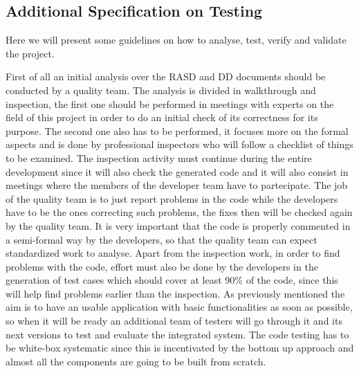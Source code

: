 \subsection{Additional Specification on Testing}
Here we will present some guidelines on how to analyse, test, verify and validate the project.

First of all an initial analysis over the RASD and DD documents should be conducted by a quality team.
The analysis is divided in walkthrough and inspection, the first one should be performed in meetings with experts on the field of this project in order to do an initial check of its correctness for its purpose.
The second one also has to be performed, it focuses more on the formal aspects and is done by professional inspectors who will follow a checklist of things to be examined.
The inspection activity must continue during the entire development since it will also check the generated code and it will also consist in meetings where the members of the developer team have to partecipate.
The job of the quality team is to just report problems in the code while the developers have to be the ones correcting such problems, the fixes then will be checked again by the quality team.
It is very important that the code is properly commented in a semi-formal way by the developers, so that the quality team can expect standardized work to analyse.
Apart from the inspection work, in order to find problems with the code, effort must also be done by the developers in the generation of test cases which should cover at least 90\% of the code, since this will help find problems earlier than the inspection.
As previously mentioned the aim is to have an usable application with basic functionalities as soon as possible, so when it will be ready an additional team of testers will go through it and its next versions to test and evaluate the integrated system.
The code testing has to be white-box systematic since this is incentivated by the bottom up approach and almost all the components are going to be built from scratch.

